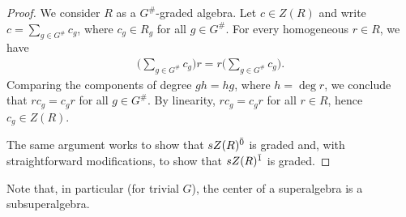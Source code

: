 \begin{proof}
	We consider $R$ as a $G^\#$-graded algebra.
	Let $c \in Z(R)$ and write $c = \sum_{g \in G^\#} c_g$, where $c_g \in R_g$ for all $g \in G^\#$.
	For every homogeneous $r \in R$, we have
	\begin{align*}
		\big(\sum_{g\in G^\#} c_g\big)r = r \big(\sum_{g\in G^\#} c_g\big).
	\end{align*}
	Comparing the components of degree $gh = hg$, where $h = \deg r$, we conclude that $rc_g = c_g r$ for all $g \in G^\#$.
	By linearity, $r c_g = c_g r$ for all $r\in R$, hence $c_g \in Z(R)$.

	The same argument works to show that $sZ(R)^{\bar0}$ is graded and, with straightforward modifications, to show that $sZ(R)^{\bar1}$ is graded.
\end{proof}

Note that, in particular (for trivial $G$), the center of a superalgebra is a subsuperalgebra. 

